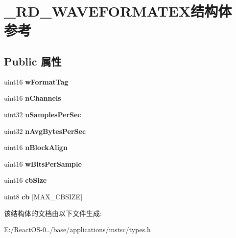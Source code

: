 \hypertarget{struct___r_d___w_a_v_e_f_o_r_m_a_t_e_x}{}\section{\+\_\+\+R\+D\+\_\+\+W\+A\+V\+E\+F\+O\+R\+M\+A\+T\+E\+X结构体 参考}
\label{struct___r_d___w_a_v_e_f_o_r_m_a_t_e_x}
\subsection*{Public 属性}
\begin{DoxyCompactItemize}
\item 
\mbox{\label{struct___r_d___w_a_v_e_f_o_r_m_a_t_e_x_a10bce0a32553dcce1bcf5bfcc7d28342}} 
uint16 {\bfseries w\+Format\+Tag}
\item 
\mbox{\label{struct___r_d___w_a_v_e_f_o_r_m_a_t_e_x_aa6e4ec1998489c1dfa92ea5d50c1a762}} 
uint16 {\bfseries n\+Channels}
\item 
\mbox{\label{struct___r_d___w_a_v_e_f_o_r_m_a_t_e_x_ad3c1e092a8e46770dd689594f2a14b46}} 
uint32 {\bfseries n\+Samples\+Per\+Sec}
\item 
\mbox{\label{struct___r_d___w_a_v_e_f_o_r_m_a_t_e_x_a5692f425b2b326578c934ab85282e289}} 
uint32 {\bfseries n\+Avg\+Bytes\+Per\+Sec}
\item 
\mbox{\label{struct___r_d___w_a_v_e_f_o_r_m_a_t_e_x_ae576b9945bf41e9b5b0961e8d66ef342}} 
uint16 {\bfseries n\+Block\+Align}
\item 
\mbox{\label{struct___r_d___w_a_v_e_f_o_r_m_a_t_e_x_af1855eda09a3e652ae45c592c9214058}} 
uint16 {\bfseries w\+Bits\+Per\+Sample}
\item 
\mbox{\label{struct___r_d___w_a_v_e_f_o_r_m_a_t_e_x_a5ea950d1468dc7cb250155b686c84b1e}} 
uint16 {\bfseries cb\+Size}
\item 
\mbox{\label{struct___r_d___w_a_v_e_f_o_r_m_a_t_e_x_ab0c58edfdf430bdbe3726b8be582d40e}} 
uint8 {\bfseries cb} \mbox{[}M\+A\+X\+\_\+\+C\+B\+S\+I\+ZE\mbox{]}
\end{DoxyCompactItemize}


该结构体的文档由以下文件生成\+:\begin{DoxyCompactItemize}
\item 
E\+:/\+React\+O\+S-\/0../base/applications/mstsc/types.\+h\end{DoxyCompactItemize}
